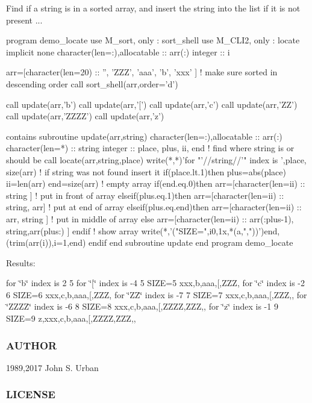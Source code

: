 Find if a string is in a sorted array, and insert the string into the list if it is not present ... \begin{DoxyVerb}program demo_locate
use M_sort, only : sort_shell
use M_CLI2, only : locate
implicit none
character(len=:),allocatable  :: arr(:)
integer                       :: i

arr=[character(len=20) :: '', 'ZZZ', 'aaa', 'b', 'xxx' ]
! make sure sorted in descending order
call sort_shell(arr,order='d')

call update(arr,'b')
call update(arr,'[')
call update(arr,'c')
call update(arr,'ZZ')
call update(arr,'ZZZZ')
call update(arr,'z')

contains
subroutine update(arr,string)
character(len=:),allocatable :: arr(:)
character(len=*)             :: string
integer                      :: place, plus, ii, end
! find where string is or should be
call locate(arr,string,place)
write(*,*)'for "'//string//'" index is ',place, size(arr)
! if string was not found insert it
if(place.lt.1)then
   plus=abs(place)
   ii=len(arr)
   end=size(arr)
   ! empty array
   if(end.eq.0)then
      arr=[character(len=ii) :: string ]
   ! put in front of array
   elseif(plus.eq.1)then
      arr=[character(len=ii) :: string, arr]
   ! put at end of array
   elseif(plus.eq.end)then
      arr=[character(len=ii) :: arr, string ]
   ! put in middle of array
   else
      arr=[character(len=ii) :: arr(:plus-1), string,arr(plus:) ]
   endif
   ! show array
   write(*,'("SIZE=",i0,1x,*(a,","))')end,(trim(arr(i)),i=1,end)
endif
end subroutine update
end program demo_locate
\end{DoxyVerb}


Results\+:

for \char`\"{}b\char`\"{} index is 2 5 for \char`\"{}\mbox{[}\char`\"{} index is -\/4 5 S\+I\+ZE=5 xxx,b,aaa,\mbox{[},Z\+ZZ, for \char`\"{}c\char`\"{} index is -\/2 6 S\+I\+ZE=6 xxx,c,b,aaa,\mbox{[},Z\+ZZ, for \char`\"{}\+Z\+Z\char`\"{} index is -\/7 7 S\+I\+ZE=7 xxx,c,b,aaa,\mbox{[},Z\+ZZ,, for \char`\"{}\+Z\+Z\+Z\+Z\char`\"{} index is -\/6 8 S\+I\+ZE=8 xxx,c,b,aaa,\mbox{[},Z\+Z\+ZZ,Z\+ZZ,, for \char`\"{}z\char`\"{} index is -\/1 9 S\+I\+ZE=9 z,xxx,c,b,aaa,\mbox{[},Z\+Z\+ZZ,Z\+ZZ,,

\subsubsection*{A\+U\+T\+H\+OR}

1989,2017 John S. Urban \subsubsection*{L\+I\+C\+E\+N\+SE}

